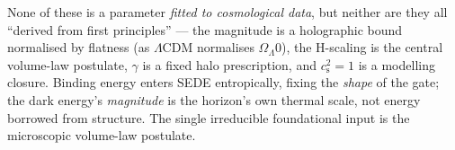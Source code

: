 \documentclass[preprint,12pt]{elsarticle}
\begin{document}
None of these is a parameter \emph{fitted to cosmological data}, but
neither are they all ``derived from first principles'' --- the magnitude
is a holographic bound normalised by flatness (as
\(\Lambda \mathrm{CDM}\) normalises \(\Omega _\Lambda 0\)), the
H-scaling is the central volume-law postulate, \(\gamma\) is a fixed
halo prescription, and \(c_{\mathrm{s}}^{2} = 1\) is a modelling
closure. Binding energy enters SEDE entropically, fixing the
\emph{shape} of the gate; the dark energy's \emph{magnitude} is the
horizon's own thermal scale, not energy borrowed from structure. The
single irreducible foundational input is the microscopic volume-law
postulate.



\end{document}
